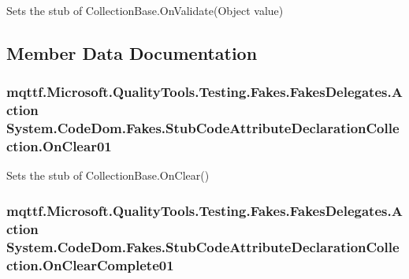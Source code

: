 Sets the stub of Collection\-Base.\-On\-Validate(\-Object value)



\subsection{Member Data Documentation}
\hypertarget{class_system_1_1_code_dom_1_1_fakes_1_1_stub_code_attribute_declaration_collection_a44ce89103a1ab8ae1a8ff38761351a96}{
\subsubsection[{On\-Clear01}]{\setlength{\rightskip}{0pt plus 5cm}mqttf.\-Microsoft.\-Quality\-Tools.\-Testing.\-Fakes.\-Fakes\-Delegates.\-Action System.\-Code\-Dom.\-Fakes.\-Stub\-Code\-Attribute\-Declaration\-Collection.\-On\-Clear01}}\label{class_system_1_1_code_dom_1_1_fakes_1_1_stub_code_attribute_declaration_collection_a44ce89103a1ab8ae1a8ff38761351a96}


Sets the stub of Collection\-Base.\-On\-Clear()

\hypertarget{class_system_1_1_code_dom_1_1_fakes_1_1_stub_code_attribute_declaration_collection_a5794e1d828a50b749b64ffc22055d07a}{
\subsubsection[{On\-Clear\-Complete01}]{\setlength{\rightskip}{0pt plus 5cm}mqttf.\-Microsoft.\-Quality\-Tools.\-Testing.\-Fakes.\-Fakes\-Delegates.\-Action System.\-Code\-Dom.\-Fakes.\-Stub\-Code\-Attribute\-Declaration\-Collection.\-On\-Clear\-Complete01}}\label{class_system_1_1_code_dom_1_1_fakes_1_1_stub_code_attribute_declaration_collection_a5794e1d828a50b749b64ffc22055d07a}


